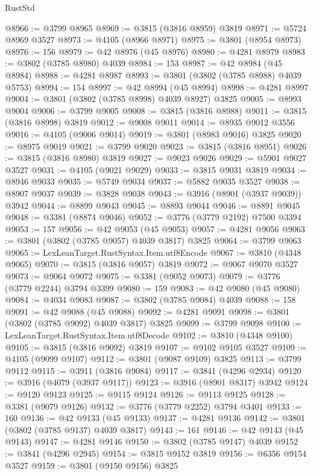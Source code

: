 \begin{lexlean}{RustStd}
\begin{coremodule}
@8966 := @3799 @8965
@8969 := @3815 (@3816 @8959) @3819
@8971 := @5724 @8969 @3527
@8973 := @4105 (@8966 @8971)
@8975 := @3801 (@8954 @8973)
@8976 := 156
@8979 := @42 @8976 (@45 @8976)
@8980 := @4281 @8979
@8983 := @3802 (@3785 @8980) @4039
@8984 := 153
@8987 := @42 @8984 (@45 @8984)
@8988 := @4281 @8987
@8993 := @3801 (@3802 (@3785 @8988) @4039 @5753)
@8994 := 154
@8997 := @42 @8994 (@45 @8994)
@8998 := @4281 @8997
@9004 := @3801 (@3802 (@3785 @8998) @4039 @8927) @3825
@9005 := @8993 @9004
@9006 := @3799 @9005
@9008 := @3815 (@3816 @8988)
@9011 := @3815 (@3816 @8998) @3819
@9012 := @9008 @9011
@9014 := @8935 @9012 @3556
@9016 := @4105 (@9006 @9014)
@9019 := @3801 (@8983 @9016) @3825
@9020 := @8975 @9019
@9021 := @3799 @9020
@9023 := @3815 (@3816 @8951)
@9026 := @3815 (@3816 @8980) @3819
@9027 := @9023 @9026
@9029 := @5901 @9027 @3527
@9031 := @4105 (@9021 @9029)
@9033 := @3815 @9031 @3819
@9034 := @8946 @9033
@9035 := @5749 @9034
@9037 := @5882 @9035 @3527
@9038 := @8907 @9037
@9039 := @3828 @9038
@9043 := @3916 (@8901 (@3937 @9039)) @3942
@9044 := @8899 @9043
@9045 := @8893 @9044
@9046 := @8891 @9045
@9048 := @3381 (@8874 @9046)
@9052 := @3776 (@3779 @2192) @7500 @3394
@9053 := 157
@9056 := @42 @9053 (@45 @9053)
@9057 := @4281 @9056
@9063 := @3801 (@3802 (@3785 @9057) @4039 @3817) @3825
@9064 := @3799 @9063
@9065 := LexLeanTarget.RustSyntax.Item.utf8Encode
@9067 := @3810 (@4348 @9065)
@9070 := @3815 (@3816 @9057) @3819
@9072 := @9067 @9070 @3527
@9073 := @9064 @9072
@9075 := @3381 (@9052 @9073)
@9079 := @3776 (@3779 @2244) @3794 @3399
@9080 := 159
@9083 := @42 @9080 (@45 @9080)
@9084 := @4034 @9083
@9087 := @3802 (@3785 @9084) @4039
@9088 := 158
@9091 := @42 @9088 (@45 @9088)
@9092 := @4281 @9091
@9098 := @3801 (@3802 (@3785 @9092) @4039 @3817) @3825
@9099 := @3799 @9098
@9100 := LexLeanTarget.RustSyntax.Item.utf8Decode
@9102 := @3810 (@4348 @9100)
@9105 := @3815 (@3816 @9092) @3819
@9107 := @9102 @9105 @3527
@9109 := @4105 (@9099 @9107)
@9112 := @3801 (@9087 @9109) @3825
@9113 := @3799 @9112
@9115 := @3911 (@3816 @9084)
@9117 := @3841 (@4296 @2934)
@9120 := @3916 (@4079 (@3937 @9117))
@9123 := @3916 (@8901 @8317) @3942
@9124 := @9120 @9123
@9125 := @9115 @9124
@9126 := @9113 @9125
@9128 := @3381 (@9079 @9126)
@9132 := @3776 (@3779 @2252) @3794 @3401
@9133 := 160
@9136 := @42 @9133 (@45 @9133)
@9137 := @4281 @9136
@9142 := @3801 (@3802 (@3785 @9137) @4039 @3817)
@9143 := 161
@9146 := @42 @9143 (@45 @9143)
@9147 := @4281 @9146
@9150 := @3802 (@3785 @9147) @4039
@9152 := @3841 (@4296 @2945)
@9154 := @3815 @9152 @3819
@9156 := @6356 @9154 @3527
@9159 := @3801 (@9150 @9156) @3825

\end{coremodule}
\end{lexlean}
